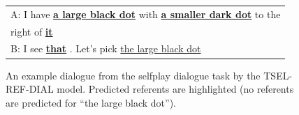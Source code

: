 \begin{figure}[th!]
\centering
{}
\small
\begin{tabular}{l}
\toprule
A: I have {\color{myred} \underline{\textbf{a large black dot}}} with {\color{myblue} \underline{\textbf{a smaller dark dot}}} to the\\ right of {\color{myred} \underline{\textbf{it}}} \\
B: I see {\color{mygreen} \underline{\textbf{that}}} . Let's pick \underline{the large black dot} \\
\bottomrule
\end{tabular}
\caption{An example dialogue from the selfplay dialogue task by the TSEL-REF-DIAL model. Predicted referents are highlighted (no referents are predicted for ``the large black dot'').
}
\label{fig:selfplay}
\end{figure}

